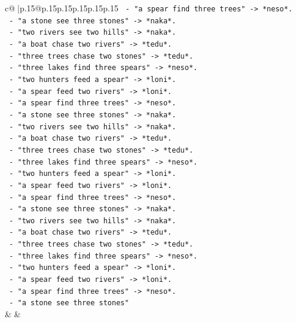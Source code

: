 \documentclass{article}
\begin{document}
{\begin{supertabular}{c@{$\;$}|p{.15\linewidth}@{}p{.15\linewidth}p{.15\linewidth}p{.15\linewidth}p{.15\linewidth}p{.15\linewidth}}
{{{\texttt{           {-} "a spear find three trees" {-}> *neso*.} \\
\texttt{           {-} "a stone see three stones" {-}> *naka*.} \\
\texttt{           {-} "two rivers see two hills" {-}> *naka*.} \\
\texttt{           {-} "a boat chase two rivers" {-}> *tedu*.} \\
\texttt{           {-} "three trees chase two stones" {-}> *tedu*.} \\
\texttt{           {-} "three lakes find three spears" {-}> *neso*.} \\
\texttt{           {-} "two hunters feed a spear" {-}> *loni*.} \\
\texttt{           {-} "a spear feed two rivers" {-}> *loni*.} \\
\texttt{           {-} "a spear find three trees" {-}> *neso*.} \\
\texttt{           {-} "a stone see three stones" {-}> *naka*.} \\
\texttt{           {-} "two rivers see two hills" {-}> *naka*.} \\
\texttt{           {-} "a boat chase two rivers" {-}> *tedu*.} \\
\texttt{           {-} "three trees chase two stones" {-}> *tedu*.} \\
\texttt{           {-} "three lakes find three spears" {-}> *neso*.} \\
\texttt{           {-} "two hunters feed a spear" {-}> *loni*.} \\
\texttt{           {-} "a spear feed two rivers" {-}> *loni*.} \\
\texttt{           {-} "a spear find three trees" {-}> *neso*.} \\
\texttt{           {-} "a stone see three stones" {-}> *naka*.} \\
\texttt{           {-} "two rivers see two hills" {-}> *naka*.} \\
\texttt{           {-} "a boat chase two rivers" {-}> *tedu*.} \\
\texttt{           {-} "three trees chase two stones" {-}> *tedu*.} \\
\texttt{           {-} "three lakes find three spears" {-}> *neso*.} \\
\texttt{           {-} "two hunters feed a spear" {-}> *loni*.} \\
\texttt{           {-} "a spear feed two rivers" {-}> *loni*.} \\
\texttt{           {-} "a spear find three trees" {-}> *neso*.} \\
\texttt{           {-} "a stone see three stones"} \\
            }
        }
    }
    & & \\ \\


\end{supertabular}}
\end{document}
